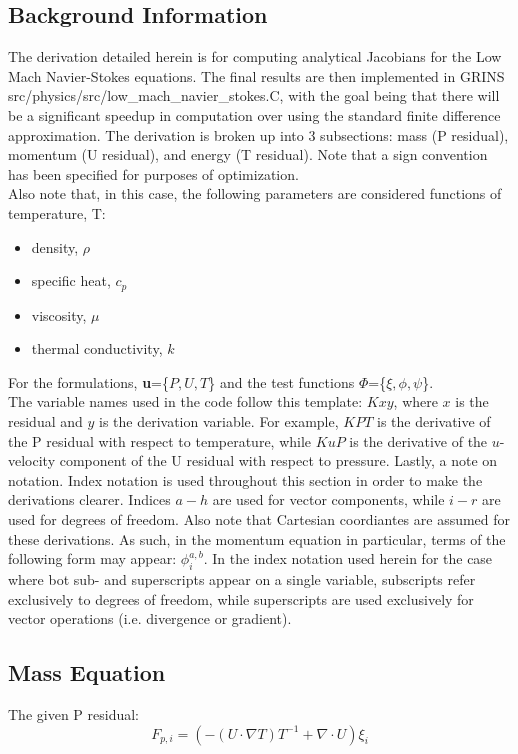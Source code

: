 \subsection{Background Information}
The derivation detailed herein is for computing analytical Jacobians for the Low Mach Navier-Stokes equations. The final results are then implemented in GRINS src/physics/src/low\_mach\_navier\_stokes.C, with the goal being that there
will be a significant speedup in computation over using the standard finite difference approximation. The derivation is broken up into 3 subsections: mass (P residual), momentum (U residual), and energy (T residual).
Note that a sign convention has been specified for purposes of optimization.\\
Also note that, in this case, the following parameters are considered functions of temperature, T:
\begin{itemize}
    \item density, $\rho$
    \item specific heat, $c_p$
    \item viscosity, $\mu$
    \item thermal conductivity, $k$
\end{itemize}
For the formulations, \textbf{u}=\{$P,U,T$\} and the test functions \textbf{$\Phi$}=\{$\xi,\phi,\psi$\}.\\
The variable names used in the code follow this template: $Kxy$, where $x$ is the residual and $y$ is the derivation variable.  For example, $KPT$ is the derivative of the P residual with respect to temperature,
while $KuP$ is the derivative of the $u$-velocity component of the U residual with respect to pressure. \newline
Lastly, a note on notation. Index notation is used throughout this section in order to make the derivations clearer. Indices $a-h$ are used for vector components, while $i-r$ are used for degrees of freedom.
Also note that Cartesian coordiantes are assumed for these derivations. As such, in the momentum equation in particular, terms of the following form may appear: $\phi_i^{a,b}$. In the index notation used herein for the case
where bot sub- and superscripts appear on a single variable, 
subscripts refer exclusively to degrees of freedom, while superscripts are used exclusively for vector operations (i.e. divergence or gradient).

\newpage
\subsection{Mass Equation}
The given P residual:
\begin{equation}
    F_{p,i} = (-(U \cdot \nabla T) T^{-1} + \nabla \cdot U)\xi_i
\end{equation}

